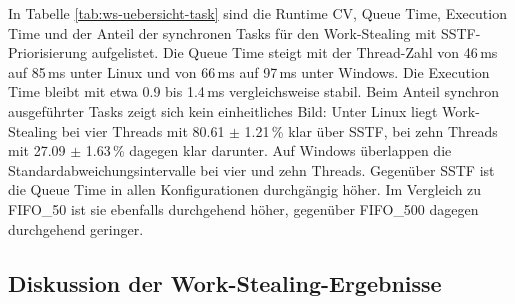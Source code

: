 \begin{sloppypar}
\begin{table}[H]
\caption{Runtime \acs{CV} sowie Queue Time, Execution Time und Anteil synchroner Tasks des Work-Stealing-Schedulers mit \acs{SSTF}-Priorisierung für Linux und Windows bei einem, vier und zehn Threads, angegeben als Mittelwerte $\pm$ Standardabweichung aus $n=20$ Läufen}
\label{tab:ws-uebersicht-task}
\centering
\begingroup
\setlength{\tabcolsep}{4pt}
\endgroup
\end{table}

\noindent In Tabelle \ref{tab:ws-uebersicht-task} sind die Runtime \acs{CV}, Queue Time, Execution Time und der Anteil der synchronen Tasks für den Work-Stealing mit \acs{SSTF}-Priorisierung aufgelistet. Die Queue Time steigt mit der Thread-Zahl von 46\,ms auf 85\,ms unter Linux und von 66\,ms auf 97\,ms unter Windows. Die Execution Time bleibt mit etwa 0.9 bis 1.4\,ms vergleichsweise stabil. Beim Anteil synchron ausgeführter Tasks zeigt sich kein einheitliches Bild: Unter Linux liegt Work-Stealing bei vier Threads mit 80.61 $\pm$ 1.21\,\% klar über \acs{SSTF}, bei zehn Threads mit 27.09 $\pm$ 1.63\,\% dagegen klar darunter. Auf Windows überlappen die Standardabweichungsintervalle bei vier und zehn Threads. Gegenüber \acs{SSTF} ist die Queue Time in allen Konfigurationen durchgängig höher. Im Vergleich zu \acs{FIFO}\_50 ist sie ebenfalls durchgehend höher, gegenüber \acs{FIFO}\_500 dagegen durchgehend geringer.



\subsection{Diskussion der Work-Stealing-Ergebnisse}


\end{sloppypar}
